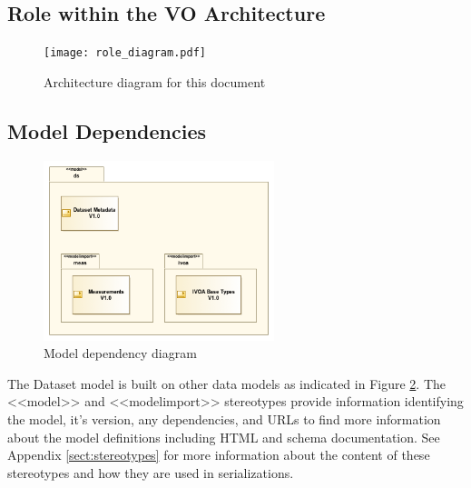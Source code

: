 \documentclass[11pt,a4paper]{ivoa}
\begin{document}
\pagebreak
\subsection{Role within the VO Architecture}

\begin{figure}[h]
\centering

\texttt{[image: role\_diagram.pdf]}
\caption{Architecture diagram for this document}
\label{fig:archdiag}
\end{figure}



\pagebreak
\subsection{Model Dependencies}

\begin{figure}[h]
\centering

\includegraphics[width=0.6\textwidth]{diagrams/model_dependencies.png}
\caption{Model dependency diagram}
\label{fig:dependencies}
\end{figure}

The Dataset model is built on other data models as indicated in Figure \ref{fig:dependencies}.
The <<model>> and <<modelimport>> stereotypes provide information identifying the
model, it's version, any dependencies, and URLs to find more information about
the model definitions including HTML and schema documentation. See Appendix \ref{sect:stereotypes}
for more information about the content of these stereotypes and how they are
used in serializations.
\end{document}

